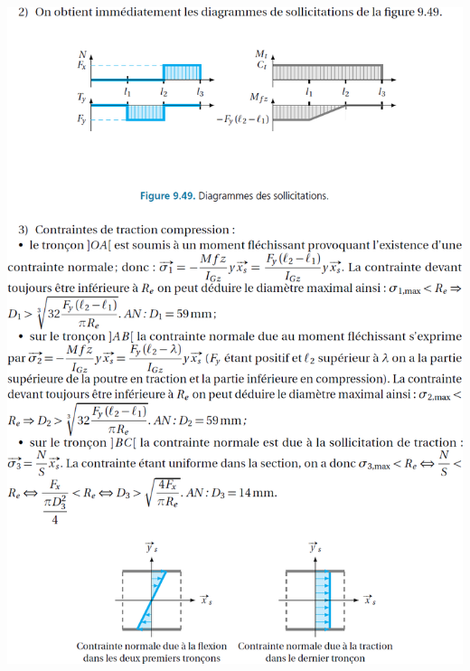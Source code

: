 \documentclass[10pt,fleqn]{article} %
\begin{document}
\begin{center}
\includegraphics[width=\linewidth]{images/cor_02}


\end{center}
\end{document}

